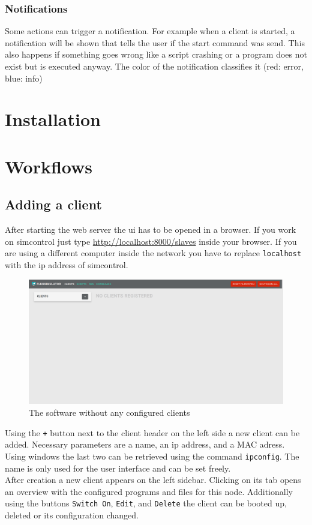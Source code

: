 \documentclass[accentcolor=tud1a, paper=a4, colorback]{tudreport}
\newcommand{\ind}[1]{#1\index{#1}}
\begin{document}
	\subsection{Notifications}
	Some actions can trigger a notification. For example when a client is started, a notification will be shown that
	tells the user if the start command was send. This also happens if something goes wrong like a script crashing
	or a program does not exist but is executed anyway. The color of the notification classifies it
	({\color{red}red: error}, {\color{blue}blue: info})

	\chapter{Installation}


	\chapter{Workflows}
	\section{Adding a client}
	After starting the web server the ui has to be opened in a browser.
	If you work on \ind{simcontrol} just type \url{http://localhost:8000/slaves} inside
	your browser. If you are using a different computer inside the network you
	have to replace \texttt{localhost} with the ip address of simcontrol.
	\\
	\begin{figure}[h]
		\centering
		\includegraphics[width=.9\textwidth]{empty_startpage}
		\caption{The software without any configured clients}
		\label{empty_startpage}
	\end{figure}
	Using the \texttt{+} button next to the client header on the left side
	a new client can be added. Necessary parameters are a name, an ip address,
	and a MAC adress. Using windows the last two can be retrieved using
	the command \texttt{ipconfig}. The name is only used for the user interface
	and can be set freely.
	\\
	After creation a new client appears on the left sidebar. Clicking on its tab
	opens an overview with the configured programs and files for this node.
	Additionally using the buttons \texttt{Switch On}, \texttt{Edit}, and \texttt{Delete}
	the client can be booted up, deleted or its configuration changed.
\end{document}
